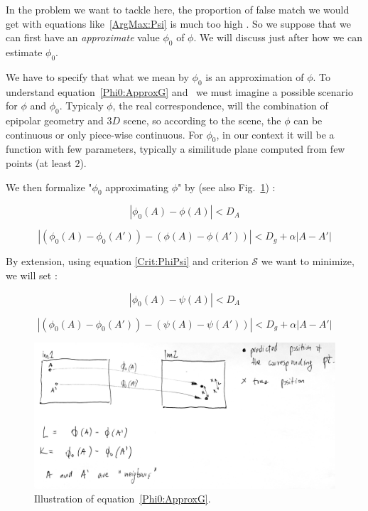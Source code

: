 In the problem we want to tackle here, the proportion of false match we would get with
equations like~\ref{ArgMax:Psi} is much too high . So we suppose that we can first
have an \emph{approximate} value $\phi_0$ of $\phi$. We will discuss just after how we can
estimate $\phi_0$.

We have to specify that what we mean by $\phi_0$ is an approximation of $\phi$.
To understand equation~\ref{Phi0:ApproxG}  and~\label{Phi0:Appro} we must
imagine a possible scenario for $\phi$ and $\phi_0$. Typicaly $\phi$, the real
correspondence, will the combination of epipolar geometry and $3D$ scene, so according
to the scene, the $\phi$ can be  continuous or only piece-wise continuous. For $\phi_0$,
in our context it will be a function with few parameters, typically a similitude
plane computed from few points (at least $2$). 

We then formalize "$\phi_0$ approximating  $\phi$" by (see also Fig.~\ref{fig:spatial-consist}) :


\begin{equation}
     | \phi_0(A)  - \phi(A) |  < D_A  \label{Phi0:Appro}
\end{equation}

\begin{equation}
     | (\phi_0(A) - \phi_0(A')) -(\phi(A) - \phi(A')) |  < D_g +  \alpha |A-A'|  \label{Phi0:ApproxG}
\end{equation}

By extension, using equation \ref{Crit:PhiPsi} and criterion $\mathcal S$ we want to minimize,
we will set :

\begin{equation}
     | \phi_0(A)  - \psi(A) |  < D_A  \label{PsiPhi0:Appro}
\end{equation}

\begin{equation}
     | (\phi_0(A) - \phi_0(A')) -(\psi(A) - \psi(A')) |  < D_g +  \alpha |A-A'|  \label{PsiPhi0:ApproxG}
\end{equation}

\begin{figure}
\centering
\includegraphics[width=12cm]{Methods/Images/spatial_consist.JPG}\caption{Illustration of equation~\ref{Phi0:ApproxG}.}\label{fig:spatial-consist}
\end{figure}

